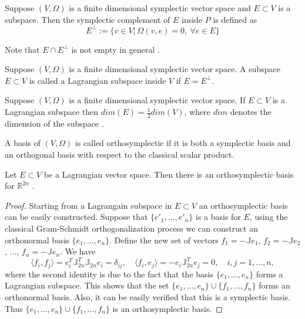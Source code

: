 {\edit 
\begin{definition}
Suppose $(V,\Omega)$ is a finite dimensional symplectic vector space and $E\subset V$ is a subspace. Then the symplectic complement of $E$ inside $P$ is defined as
\[
	E^{\perp} := \{ v\in V |\ \Omega(v,e) = 0,\ \forall e\in E \}
\]
\end{definition}
Note that $E \cap E^{\perp}$ is not empty in general \cite{de2006symplectic}. 
\begin{definition}
Suppose $(V,\Omega)$ is a finite dimensional symplectic vector space. A subspace $E\subset V$ is called a Lagrangian subspace inside $V$ if $E = E^\perp$.
\end{definition}
\begin{theorem} \label{theorem:Hasy:1.5}
Suppose $(V,\Omega)$ is a finite dimensional symplectic vector space. If $E\subset V$ is a Lagrangian subspace then $dim(E)=\frac 1 2dim(V)$, where $dim$ denotes the dimension of the subspace \cite{abraham1978foundations}.
\end{theorem}
\begin{definition}
A basis of $(V,\Omega)$ is called orthosymplectic if it is both a symplectic basis and an orthogonal basis with respect to the classical scalar product.
\end{definition}
\begin{theorem} \label{theorem:Hasy:1.6}
Let $E\subset V$ be a Lagrangian vector space. Then there is an orthosymplectic basis for $\mathbb R^{2n}$ \cite{da2003introduction}.
\end{theorem}
\begin{proof}
Starting from a Lagrangain subspace in $E \subset V$ an orthosymplectic basis can be easily constructed.  Suppose that $\{ e'_1,\dots, e'_n \}$ is a basis for $E$, using the classical Gram-Schmidt orthogonalization process we can construct an orthonormal basis $\{ e_1,\dots,e_n \}$. Define the new set of vectors $f_1 = -\mathbb Je_1$, $f_2 = -\mathbb Je_2$, $\dots$, $f_n= -\mathbb Je_n$. We have
\begin{equation}
	\langle f_i, f_j \rangle = e_i^T \mathbb J_{2n}^T \mathbb J_{2n} e_i = \delta_{ij}, \quad \langle f_i, e_j \rangle = -e_i \mathbb J^T_{2n} e_j = 0, \quad i,j=1,\dots,n,
\end{equation}
where the second identity is due to the fact that the basis $\{ e_1,\dots,e_n \}$ forms a Lagrangian subspace. This shows that the set $\{ e_1,\dots,e_n \}\cup \{ f_1,\dots,f_n \}$ forms an orthonormal basis. Also, it can be easily verified that this is a symplectic basis. Thus $\{ e_1,\dots,e_n \}\cup \{ f_1,\dots,f_n \}$ is an orthosymplectic basis.

\end{proof}}
